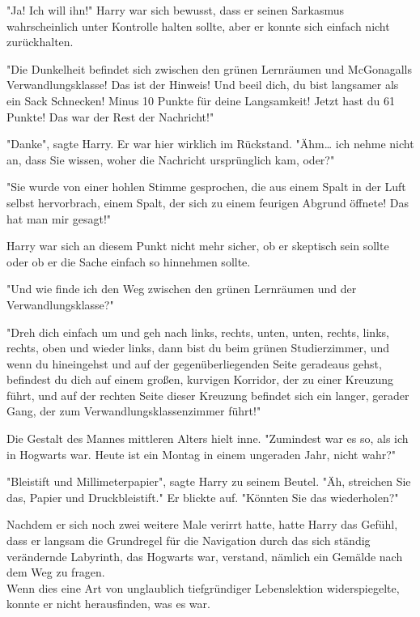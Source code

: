 {"Ja! Ich will ihn!" Harry war sich bewusst, dass er seinen Sarkasmus wahrscheinlich unter Kontrolle halten sollte, aber er konnte sich einfach nicht zurückhalten.

"Die Dunkelheit befindet sich zwischen den grünen Lernräumen und McGonagalls Verwandlungsklasse! Das ist der Hinweis! Und beeil dich, du bist langsamer als ein Sack Schnecken! Minus 10 Punkte für deine Langsamkeit! Jetzt hast du 61 Punkte! Das war der Rest der Nachricht!"

"Danke", sagte Harry. Er war hier wirklich im Rückstand. "Ähm… ich nehme nicht an, dass Sie wissen, woher die Nachricht ursprünglich kam, oder?"

"Sie wurde von einer hohlen Stimme gesprochen, die aus einem Spalt in der Luft selbst hervorbrach, einem Spalt, der sich zu einem feurigen Abgrund öffnete! Das hat man mir gesagt!"

Harry war sich an diesem Punkt nicht mehr sicher, ob er skeptisch sein sollte oder ob er die Sache einfach so hinnehmen sollte.

"Und wie finde ich den Weg zwischen den grünen Lernräumen und der Verwandlungsklasse?"

"Dreh dich einfach um und geh nach links, rechts, unten, unten, rechts, links, rechts, oben und wieder links, dann bist du beim grünen Studierzimmer, und wenn du hineingehst und auf der gegenüberliegenden Seite geradeaus gehst, befindest du dich auf einem großen, kurvigen Korridor, der zu einer Kreuzung führt, und auf der rechten Seite dieser Kreuzung befindet sich ein langer, gerader Gang, der zum Verwandlungsklassenzimmer führt!"

Die Gestalt des Mannes mittleren Alters hielt inne. "Zumindest war es so, als ich in Hogwarts war. Heute ist ein Montag in einem ungeraden Jahr, nicht wahr?"

"Bleistift und Millimeterpapier", sagte Harry zu seinem Beutel. "Äh, streichen Sie das, Papier und Druckbleistift." Er blickte auf. "Könnten Sie das wiederholen?"

Nachdem er sich noch zwei weitere Male verirrt hatte, hatte Harry das Gefühl, dass er langsam die Grundregel für die Navigation durch das sich ständig verändernde Labyrinth, das Hogwarts war, verstand, nämlich ein Gemälde nach dem Weg zu fragen.\\ Wenn dies eine Art von unglaublich tiefgründiger Lebenslektion widerspiegelte, konnte er nicht herausfinden, was es war.

}
